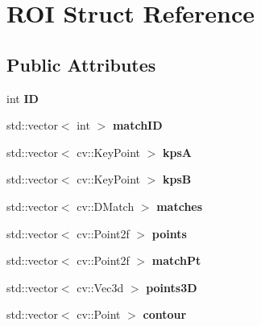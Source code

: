 \hypertarget{structROI}{}\section{R\+OI Struct Reference}
\label{structROI}
\subsection*{Public Attributes}
\begin{DoxyCompactItemize}
\item 
int {\bfseries ID}\hypertarget{structROI_a394043454af92d4ca1341b2a966abb99}{}\label{structROI_a394043454af92d4ca1341b2a966abb99}

\item 
std\+::vector$<$ int $>$ {\bfseries match\+ID}\hypertarget{structROI_af2374b1df3937a92554d2c520bad848b}{}\label{structROI_af2374b1df3937a92554d2c520bad848b}

\item 
std\+::vector$<$ cv\+::\+Key\+Point $>$ {\bfseries kpsA}\hypertarget{structROI_a0540f598bb8aeea3e79f5c0be7b3d115}{}\label{structROI_a0540f598bb8aeea3e79f5c0be7b3d115}

\item 
std\+::vector$<$ cv\+::\+Key\+Point $>$ {\bfseries kpsB}\hypertarget{structROI_af801984abc52bd1fc87ec772d000b6fd}{}\label{structROI_af801984abc52bd1fc87ec772d000b6fd}

\item 
std\+::vector$<$ cv\+::\+D\+Match $>$ {\bfseries matches}\hypertarget{structROI_a9174fe4c3ffce9b0b1e7f1d96324099f}{}\label{structROI_a9174fe4c3ffce9b0b1e7f1d96324099f}

\item 
std\+::vector$<$ cv\+::\+Point2f $>$ {\bfseries points}\hypertarget{structROI_a801f2aafd1abda91b4390f5013db17f8}{}\label{structROI_a801f2aafd1abda91b4390f5013db17f8}

\item 
std\+::vector$<$ cv\+::\+Point2f $>$ {\bfseries match\+Pt}\hypertarget{structROI_a33d6b356f1422023a0d56ec07a59e15b}{}\label{structROI_a33d6b356f1422023a0d56ec07a59e15b}

\item 
std\+::vector$<$ cv\+::\+Vec3d $>$ {\bfseries points3D}\hypertarget{structROI_a557f473bf5251e1e5c58cec28c1b22b1}{}\label{structROI_a557f473bf5251e1e5c58cec28c1b22b1}

\item 
std\+::vector$<$ cv\+::\+Point $>$ {\bfseries contour}\hypertarget{structROI_a6d57947d1a32d44261882650955ade02}{}\label{structROI_a6d57947d1a32d44261882650955ade02}


\end{DoxyCompactItemize}
